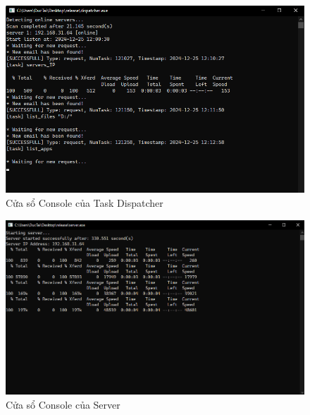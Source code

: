 \begin{figure}[H]
    \centering
    \includegraphics[width=0.93\linewidth]{img/dispatcher.png}
    \caption{Cửa sổ Console của Task Dispatcher}
\end{figure}

\begin{figure}
    \centering
    \includegraphics[width=0.93\linewidth]{img/server.png}
    \caption{Cửa sổ Console của Server}
\end{figure}
